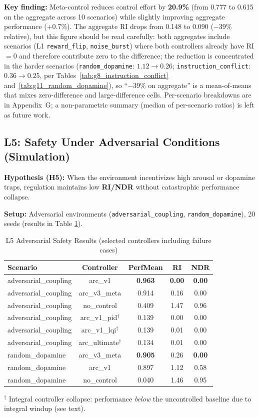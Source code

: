 \documentclass{article}
\begin{document}
\textbf{Key finding:} Meta-control reduces control effort by \textbf{20.9\%} (from 0.777 to 0.615 on the aggregate across 10 scenarios) while slightly improving aggregate performance (+0.7\%). The aggregate RI drops from 0.148 to 0.090 ($-39\%$ relative), but this figure should be read carefully: both aggregates include scenarios (L1 \texttt{reward\_flip}, \texttt{noise\_burst}) where both controllers already have RI $=0$ and therefore contribute zero to the difference; the reduction is concentrated in the harder scenarios (\texttt{random\_dopamine}: $1.12 \rightarrow 0.26$; \texttt{instruction\_conflict}: $0.36 \rightarrow 0.25$, per Tables~\ref{tab:g8_instruction_conflict} and~\ref{tab:g11_random_dopamine}), so ``$-39\%$ on aggregate'' is a mean-of-means that mixes zero-difference and large-difference cells. Per-scenario breakdowns are in Appendix~G; a non-parametric summary (median of per-scenario ratios) is left as future work.

\subsection{L5: Safety Under Adversarial Conditions (Simulation)}

\textbf{Hypothesis (H5):} When the environment incentivizes high arousal or dopamine traps, regulation maintains low \textbf{RI/NDR} without catastrophic performance collapse.

\textbf{Setup:} Adversarial environments (\texttt{adversarial\_coupling}, \texttt{random\_dopamine}), 20 seeds (results in Table \ref{tab:l5_results}).

\begin{table}[htbp]
\centering
\caption{L5 Adversarial Safety Results (selected controllers including failure cases)}
\label{tab:l5_results}
\begin{tabular}{@{}lcccc@{}}
\toprule
Scenario & Controller & PerfMean & RI & NDR \\ \midrule
adversarial\_coupling & arc\_v1 & \textbf{0.963} & \textbf{0.00} & \textbf{0.00} \\
adversarial\_coupling & arc\_v3\_meta & 0.914 & 0.16 & 0.00 \\
adversarial\_coupling & no\_control & 0.409 & 1.47 & 0.96 \\
adversarial\_coupling & arc\_v1\_pid$^\dagger$ & 0.139 & 0.00 & 0.00 \\
adversarial\_coupling & arc\_v1\_lqi$^\dagger$ & 0.139 & 0.01 & 0.00 \\
adversarial\_coupling & arc\_ultimate$^\dagger$ & 0.134 & 0.01 & 0.00 \\
\midrule
random\_dopamine & arc\_v3\_meta & \textbf{0.905} & 0.26 & \textbf{0.00} \\
random\_dopamine & arc\_v1 & 0.897 & 1.12 & 0.58 \\
random\_dopamine & no\_control & 0.040 & 1.46 & 0.95 \\ \bottomrule
\end{tabular}

\vspace{0.5em}
\footnotesize{$^\dagger$ Integral controller collapse: performance \textit{below} the uncontrolled baseline due to integral windup (see text).}
\end{table}
\end{document}
